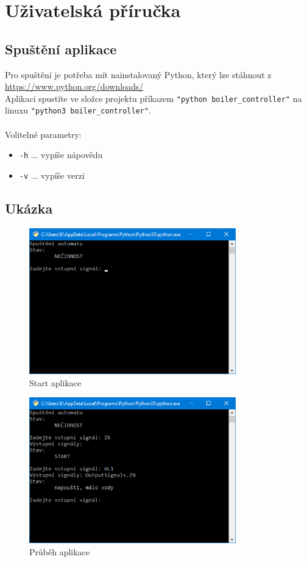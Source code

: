 \documentclass[12pt]{report}
\begin{document}
\chapter{Uživatelská příručka}
\section{Spuštění aplikace}
Pro spuštění je potřeba mít nainstalovaný Python, který lze stáhnout z \url{https://www.python.org/downloads/}\\
Aplikaci spustíte ve složce projektu příkazem \texttt{"python boiler\_controller"} na linuxu \texttt{"python3 boiler\_controller"}.\\
\\
Volitelné parametry:
\begin{itemize}
	\item \texttt{-h} ... vypíše nápovědu
	\item \texttt{-v} ... vypíše verzi
\end{itemize}

\section{Ukázka}

\begin{figure}[h]
		\centering
		\includegraphics[width=0.8\textwidth]{./images/app_start.png}	
		\caption{Start aplikace}
\end{figure}

\begin{figure}[h]
		\centering
		\includegraphics[width=0.8\textwidth]{./images/app_progress.png}	
		\caption{Průběh aplikace}
\end{figure}
\end{document}

